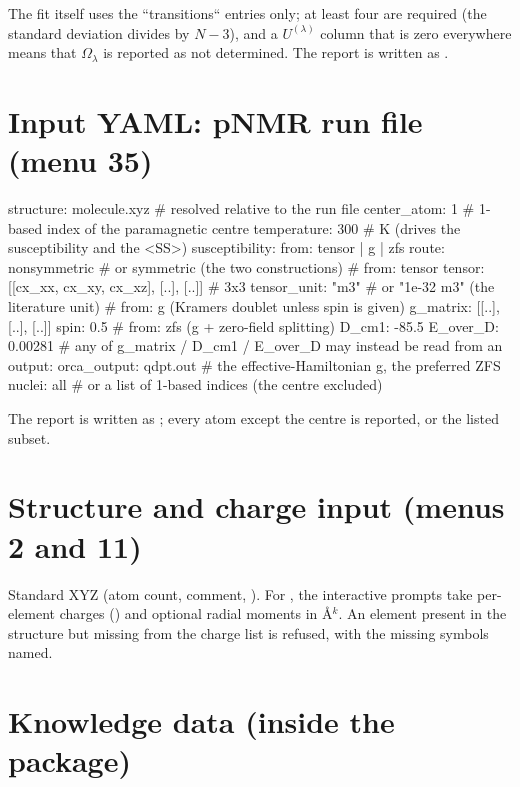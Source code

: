 The fit itself uses the ``transitions`` entries only; at least four are
required (the standard deviation divides by $N-3$), and a $U^{(\lambda)}$
column that is zero everywhere means that $\Omega_\lambda$ is reported as
not determined.  The report is written as .

\section{Input YAML: pNMR run file (menu 35)}

\begin{codeblock}
structure: molecule.xyz        # resolved relative to the run file
center_atom: 1                 # 1-based index of the paramagnetic centre
temperature: 300               # K (drives the susceptibility and the <SS>)
susceptibility:
  from: tensor | g | zfs
  route: nonsymmetric          # or symmetric (the two constructions)
  # from: tensor
  tensor: [[cx_xx, cx_xy, cx_xz], [..], [..]]   # 3x3
  tensor_unit: "m3"            # or "1e-32 m3" (the literature unit)
  # from: g  (Kramers doublet unless spin is given)
  g_matrix: [[..], [..], [..]]
  spin: 0.5
  # from: zfs  (g + zero-field splitting)
  D_cm1: -85.5
  E_over_D: 0.00281
  # any of g_matrix / D_cm1 / E_over_D may instead be read from an output:
  orca_output: qdpt.out        # the effective-Hamiltonian g, the preferred ZFS
nuclei: all                    # or a list of 1-based indices (the centre excluded)
\end{codeblock}

The report is written as ; every atom except the
centre is reported, or the listed subset.

\section{Structure and charge input (menus 2 and 11)}

Standard XYZ (atom count, comment, ). For , the
interactive prompts take per-element charges () and optional
radial moments  in \AA$^k$. An element present in the structure
but missing from the charge list is refused, with the missing symbols named.

\section{Knowledge data (inside the package)}

